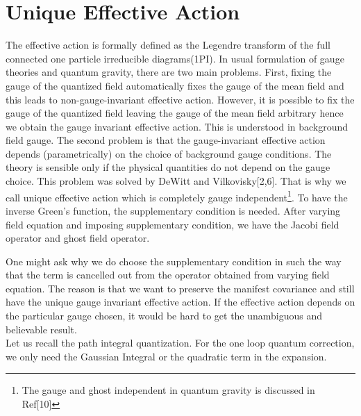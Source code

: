 \documentclass[a4paper,12 pt]{article}
\begin{document}
\section{Unique Effective Action}
The effective action is formally defined as the Legendre transform
of the full connected one particle irreducible diagrams(1PI). In
usual formulation of gauge theories and quantum gravity, there are
two main problems. First, fixing the gauge of the quantized field
automatically fixes the gauge of the mean field and this leads to
non-gauge-invariant effective action. However, it is possible to
fix the gauge of the quantized field leaving the gauge of the mean
field arbitrary hence we obtain the gauge invariant effective
action. This is understood in background field gauge. The second
problem is that the gauge-invariant effective action depends
(parametrically) on the choice of background gauge conditions. The
theory is sensible only if the physical quantities do not depend
on the gauge choice. This problem was solved by DeWitt and
Vilkovisky[2,6]. That is why we call unique effective action which
is completely gauge independent\footnote{The gauge and ghost
independent in quantum gravity is discussed in Ref[10]}. To have
the inverse Green's function, the supplementary condition is
needed. After varying field equation and imposing supplementary
condition, we have the Jacobi field operator and ghost field
operator.
\begin{center}
\coordHE{}
\end{center}
\begin{center}
 \coordHE{}
\end{center}
One might ask why we do choose the supplementary condition in such
the way that the \coordHE{} term is cancelled out from
the operator obtained from varying field equation. The reason is
that we want to preserve the manifest covariance and still have
the unique gauge invariant effective action. If the effective
action depends on the particular gauge chosen, it would be hard to
get the unambiguous and believable result.
\\
Let us recall the path integral quantization. For the one loop
quantum correction, we only need the
 Gaussian Integral or the quadratic term in the expansion.
\begin{center}
   \coordHE{}
 \end{center}
\end{document}
